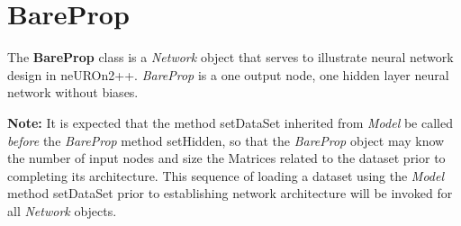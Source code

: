 \documentclass{report}
\begin{document}
\section{BareProp}

The {\bf BareProp} class is a {\em Network} object that serves to
illustrate neural network design in neUROn2++.  {\em BareProp} is a
one output node, one hidden layer neural network without biases.

{\bf Note:} It is expected that the method setDataSet inherited from
{\em Model} be called {\em before} the {\em BareProp} method
setHidden, so that the {\em BareProp} object may know the number of
input nodes and size the Matrices related to the dataset prior to
completing its architecture.  This sequence of loading a dataset using
the {\em Model} method setDataSet prior to establishing network
architecture will be invoked for all {\em Network} objects.
\end{document}
